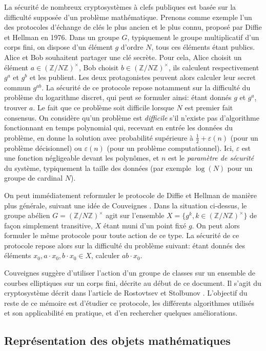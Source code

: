 \documentclass[11pt,a4paper]{article}
\newcommand{\Z}{\mathbb{Z}}
\theoremstyle{definition}
\begin{document}
La sécurité de nombreux cryptosystèmes à clefs publiques est basée sur la difficulté supposée d'un problème mathématique. Prenons comme exemple l'un des protocoles d'échange de clés le plus ancien et le plus connu, proposé par Diffie et Hellman en 1976. Dans un groupe $G$, typiquement le groupe multiplicatif d'un corps fini, on dispose d'un élément $g$ d'ordre $N$, tous ces éléments étant publics. Alice et Bob souhaitent partager une clé secrète. Pour cela, Alice choisit un élément $a\in (\Z/N\Z)^\times$, Bob choisit $b\in (\Z/N\Z)^\times$, ils calculent respectivement $g^a$ et $g^b$ et les publient. Les deux protagonistes peuvent alors calculer leur secret commun $g^{ab}$. La sécurité de ce protocole repose notamment sur la difficulté du problème du logarithme discret, qui peut se formuler ainsi: étant donnés $g$ et $g^a$, trouver $a$. Le fait que ce problème soit difficile lorsque $N$ est premier fait consensus. On considère qu'un problème est \emph{difficile} s'il n'existe pas d'algorithme fonctionnant en temps polynomial qui, recevant en entrée les données du problème, en donne la solution avec probabilité supérieure à $\frac{1}{2}+\varepsilon(n)$ (pour un problème décisionnel) ou $\varepsilon(n)$ (pour un problème computationnel). Ici, $\varepsilon$ est une fonction négligeable devant les polynômes, et $n$ est le \emph{paramètre de sécurité} du système, typiquement la taille des données (par exemple $\log(N)$ pour un groupe de cardinal $N$).

On peut immédiatement reformuler le protocole de Diffie et Hellman de manière plus générale, suivant une idée de Couveignes \cite{Couv}. Dans la situation ci-dessus, le groupe abélien $G = (\Z/N\Z)^\times$ agit sur l'ensemble $X = \{g^k, k\in (\Z/N\Z)^\times\}$ de façon simplement transitive, $X$ étant muni d'un point fixé $g$. On peut alors formuler le même protocole pour toute action de ce type. La sécurité de ce protocole repose alors sur la difficulté du problème suivant: étant donnés des éléments $x_0, a\cdot x_0, b\cdot x_0\in X$, calculer $ab\cdot x_0$.

Couveignes suggère d'utiliser l'action d'un groupe de classes sur un ensemble de courbes elliptiques sur un corps fini, décrite au début de ce document. Il s'agit du cryptosystème décrit dans l'article de Rostovtsev et Stolbunov \cite{RoSt}. L'objectif du reste de ce mémoire est d'étudier ce protocole, les différents algorithmes utilisés et son applicabilité en pratique, et d'en rechercher quelques améliorations.


\subsection{Représentation des objets mathématiques}
\end{document}
